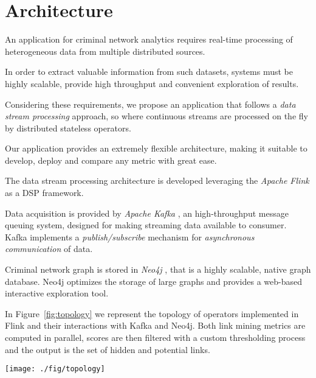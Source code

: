 \section{Architecture}
\label{sec:architecture}

An application for criminal network analytics requires real-time processing of heterogeneous data from multiple distributed sources.

In order to extract valuable information from such datasets, systems must be highly scalable, provide high throughput and convenient exploration of results.

Considering these requirements, we propose an application that follows a \textit{data stream processing} approach, so where continuous streams are processed on the fly by distributed stateless operators.

Our application provides an extremely flexible architecture, making it suitable to develop, deploy and compare any metric with great ease.

The data stream processing architecture is developed leveraging the \textit{Apache Flink} \cite{flink} as a DSP framework. 

Data acquisition is provided by \textit{Apache Kafka} \cite{kafka}, an high-throughput message queuing system, designed for making streaming data available to consumer. Kafka implements a \textit{publish/subscribe} mechanism for \textit{asynchronous communication} of data.

Criminal network graph is stored in \textit{Neo4j} \cite{neo4j}, that is a highly scalable, native graph database. Neo4j optimizes the storage of large graphs and provides a web-based interactive exploration tool.

In Figure~\ref{fig:topology} we represent the topology of operators implemented in Flink and their interactions with Kafka and Neo4j. Both link mining metrics are computed in parallel, scores are then filtered with a custom thresholding process and the output is the set of hidden and potential links.

\begin{figure*}
\centering
\texttt{[image: ./fig/topology]}
\caption{The architecture.}
\label{fig:topology}
\end{figure*}

